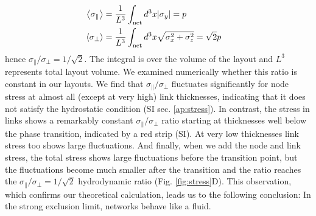 \documentclass[nofootinbib,preprint,floatfix,titlepage,endfloats]{revtex4} %
\begin{document}
\begin{align}
\left<\sigma_\parallel\right> &={1\over L^3} \int_\mathrm{net} d^3x |\sigma_y| = p\cr
\left<\sigma_\perp\right> &= {1\over L^3} \int_\mathrm{net} d^3x \sqrt{\sigma_x^2+ \sigma_z^2} = \sqrt{2} p \label{eq:sigp}   
\end{align}
hence $ \sigma_\parallel/\sigma_\perp = 1/\sqrt{2}$. The integral is over the volume of the layout and $L^3$ represents total layout volume. 
We examined numerically whether this ratio is constant in our layouts.
We find that $\sigma_\parallel/\sigma_\perp$ fluctuates significantly for node stress at almost all (except at very high) link thicknesses, indicating that it does not satisfy the hydrostatic condition (SI sec. \ref{ap:stress}).
In contrast, the stress in links shows a remarkably constant  $\sigma_\parallel/\sigma_\perp$ ratio starting at thicknesses well below the phase transition, indicated by a red strip (SI). 
At very low thicknesses link stress too shows large fluctuations. 
And finally, when we add the node and link stress, the total stress shows large fluctuations before the transition point, but the fluctuations become much smaller after the transition and the ratio  reaches the $\sigma_\parallel/\sigma_\perp = 1/\sqrt{2}$ hydrodynamic ratio (Fig. \ref{fig:stress}D). This observation, which confirms our theoretical calculation, leads us to the following conclusion: In the strong exclusion limit, networks behave like a fluid. 
\end{document}

